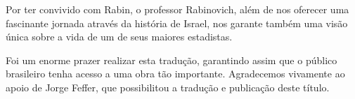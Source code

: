 Por ter convivido com Rabin, o professor Rabinovich, além de nos
oferecer uma fascinante jornada através da história de Israel, nos
garante também uma visão única sobre a vida de um de seus maiores
estadistas.

Foi um enorme prazer realizar esta tradução, garantindo assim que o
público brasileiro tenha acesso a uma obra tão importante. Agradecemos vivamente ao apoio de Jorge Feffer, que possibilitou a
tradução e publicação deste título.



